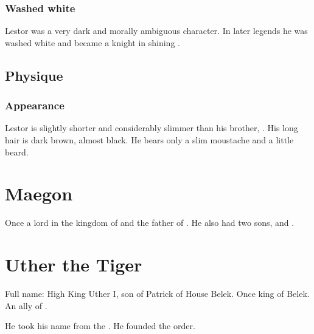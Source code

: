 \subsubsection{Washed white}
Lestor was a very dark and morally ambiguous character. 
In later legends he was washed white and became a knight in shining \armour.









\subsection{Physique}
\subsubsection{Appearance}
Lestor is slightly shorter and considerably slimmer than his brother, . 
His long hair is dark brown, almost black. 
He bears only a slim moustache and a little beard. 















\section{Maegon \Delaen}
Once a lord in the kingdom of \Imrath{} and the father of . 
He also had two sons,  and . 















\section{Uther the Tiger}
Full name: High King Uther I, son of Patrick of House Belek. 
Once king of Belek. 
An ally of . 

He took his name from the . 
He founded the  order. 















